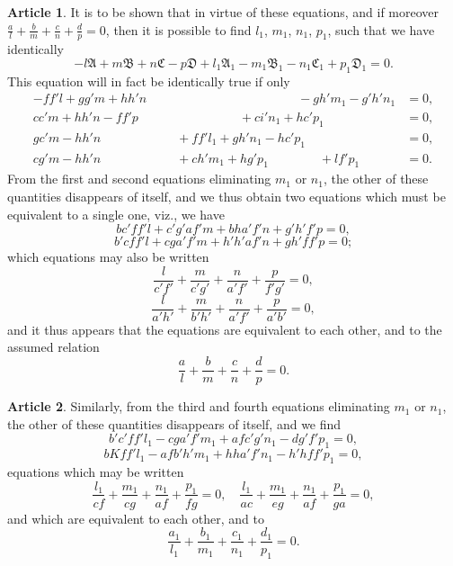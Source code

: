 \documentclass[11pt,a4paper]{article}
\theoremstyle{definition}
\newtheorem{art}{Article}
\begin{document}
\begin{art}
It is to be shown that in virtue of these equations, and if moreover $\tfrac{a}{l} + \tfrac{b}{m} + \tfrac{c}{n} + \tfrac{d}{p} = 0$, then it is possible to find $l_{1}$, $m_{1}$, $n_{1}$, $p_{1}$, such that we have identically
\[
-l\mathfrak{A} + m\mathfrak{B} + n\mathfrak{C} - p\mathfrak{D} + l_{1}\mathfrak{A}_{1} - m_{1}\mathfrak{B}_{1} - n_{1}\mathfrak{C}_{1} + p_{1}\mathfrak{D}_{1} = 0.
\]
This equation will in fact be identically true if only
\begin{align*}
-ff'l + gg'm + hh'n \quad\quad\quad\quad\quad\quad\quad\quad\quad\quad\quad\quad - gh'm_{1} - g'h'n_{1} &= 0, \\
cc'm + hh'n - ff'p \quad\quad\quad\quad\quad\quad\quad\quad + ci'n_{1} + hc'p_{1} &= 0, \\
gc'm - hh'n \quad\quad\quad\quad\quad\quad + ff'l_{1} + gh'n_{1} - hc'p_{1} &= 0, \\
cg'm - hh'n \quad\quad\quad\quad\quad\quad + ch'm_{1} + hg'p_{1} \quad\quad\quad\quad + lf'p_{1} &= 0.
\end{align*}
From the first and second equations eliminating $m_{1}$ or $n_{1}$, the other of these quantities disappears of itself, and we thus obtain two equations which must be equivalent to a single one, viz., we have
\[
bc'ff'l + c'g'af'm + bha'f'n + g'h'f'p = 0,
\]
\[
b'cff'l + cga'f'm + h'h'af'n + gh'ff'p = 0;
\]
which equations may also be written
\[
\frac{l}{c'f'} + \frac{m}{c'g'} + \frac{n}{a'f'} + \frac{p}{f'g'} = 0,
\]
\[
\frac{l}{a'h'} + \frac{m}{b'h'} + \frac{n}{a'f'} + \frac{p}{a'b'} = 0,
\]
and it thus appears that the equations are equivalent to each other, and to the assumed relation
\[
\frac{a}{l} + \frac{b}{m} + \frac{c}{n} + \frac{d}{p} = 0.
\]
\end{art}

\begin{art}
Similarly, from the third and fourth equations eliminating $m_{1}$ or $n_{1}$, the other of these quantities disappears of itself, and we find
\[
b'c'ff'l_{1} - cga'f'm_{1} + afc'g'n_{1} - dg'f'p_{1} = 0,
\]
\[
bKff'l_{1} - afb'h'm_{1} + hha'f'n_{1} - h'hff'p_{1} = 0,
\]
equations which may be written
\[
\frac{l_{1}}{cf} + \frac{m_{1}}{cg} + \frac{n_{1}}{af} + \frac{p_{1}}{fg} = 0, \quad \frac{l_{1}}{ac} + \frac{m_{1}}{eg} + \frac{n_{1}}{af} + \frac{p_{1}}{ga} = 0,
\]
and which are equivalent to each other, and to
\[
\frac{a_{1}}{l_{1}} + \frac{b_{1}}{m_{1}} + \frac{c_{1}}{n_{1}} + \frac{d_{1}}{p_{1}} = 0.
\]
\end{art}
\end{document}
